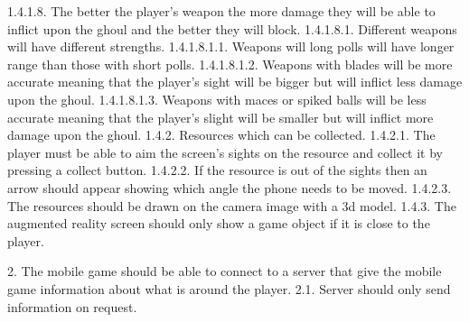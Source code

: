 \documentclass[11pt,openright,a4paper]{report}
\newcommand{\forceindent}{\leavevmode{\parindent=1em\indent}}
\begin{document}
		\forceindent \forceindent \forceindent 1.4.1.8. The better the player's weapon the more damage they will be able to inflict upon the ghoul and the better they will block.\newline
		\forceindent \forceindent \forceindent \forceindent 1.4.1.8.1. Different weapons will have different strengths.\newline
		\forceindent \forceindent \forceindent \forceindent \forceindent 1.4.1.8.1.1. Weapons will long polls will have longer range than those with short polls.\newline
		\forceindent \forceindent \forceindent \forceindent \forceindent 1.4.1.8.1.2. Weapons with blades will be more accurate meaning that the player's sight will be bigger but will inflict less damage upon the ghoul.\newline
		\forceindent \forceindent \forceindent \forceindent \forceindent 1.4.1.8.1.3. Weapons with maces or spiked balls will be less accurate meaning that the player's slight will be smaller but will inflict more damage upon the ghoul. \newline
		\forceindent \forceindent 1.4.2. Resources which can be collected. \newline
		\forceindent \forceindent \forceindent 1.4.2.1. The player must be able to aim the screen's sights on the resource and collect it by pressing a collect button. \newline
		\forceindent \forceindent \forceindent 1.4.2.2. If the resource is out of the sights then an arrow should appear showing which angle the phone needs to be moved.\newline
		\forceindent \forceindent \forceindent 1.4.2.3. The resources should be drawn on the camera image with a 3d model. \newline
		\forceindent \forceindent 1.4.3. The augmented reality screen should only show a game object if it is close to the player.\newline
		
		2.	The mobile game should be able to connect to a server that give the mobile game information about what is around the player.\newline
		\forceindent 2.1.	Server should only send information on request.\newline
		
\end{document}
